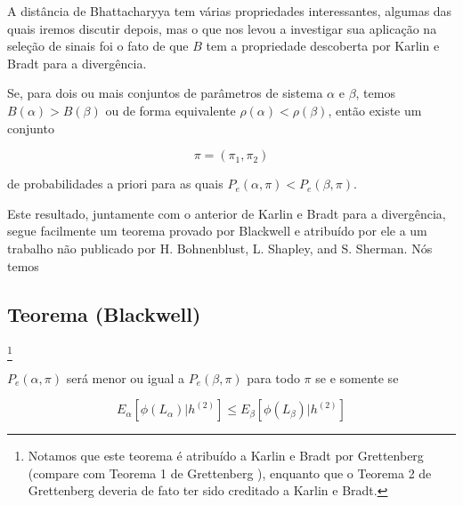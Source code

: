 \documentclass{sbrt2017port}
\begin{document}
A distância de Bhattacharyya tem várias propriedades interessantes, algumas das quais iremos discutir depois, mas o que nos levou a investigar sua aplicação na seleção de sinais foi o fato de que $B$ tem a propriedade descoberta por Karlin e Bradt para a divergência.

Se, para dois ou mais conjuntos de parâmetros de sistema $\alpha$ e $\beta$, temos $B(\alpha) > B(\beta)$ ou de forma equivalente $\rho(\alpha) < \rho(\beta)$, então existe um conjunto

\begin{equation}
 \pi = (\pi_1,\pi_2)
 \label{eq9}
\end{equation}

de probabilidades a priori para as quais $P_e(\alpha,\pi) < P_e(\beta,\pi)$.


Este resultado, juntamente com o anterior de Karlin e Bradt para a divergência, segue facilmente um teorema provado por Blackwell \cite{r19} e atribuído por ele a um trabalho não publicado por H. Bohnenblust, L. Shapley, and S. Sherman. Nós temos

\subsection{Teorema (Blackwell)} \footnote[5]{Notamos que este teorema é atribuído a Karlin e Bradt por Grettenberg (compare com Teorema 1 de Grettenberg \cite{r10}), enquanto que o Teorema 2 de Grettenberg deveria de fato ter sido creditado a Karlin e Bradt.}

$P_e(\alpha,\pi)$ será menor ou igual a $P_e(\beta,\pi)$ para todo $\pi$ se e somente se
 
\begin{equation}
 E_\alpha[\phi (L_\alpha)|h^{(2)}] \leq E_\beta[\phi (L_\beta)|h^{(2)}]
 \label{eq10}
\end{equation}
\end{document}
